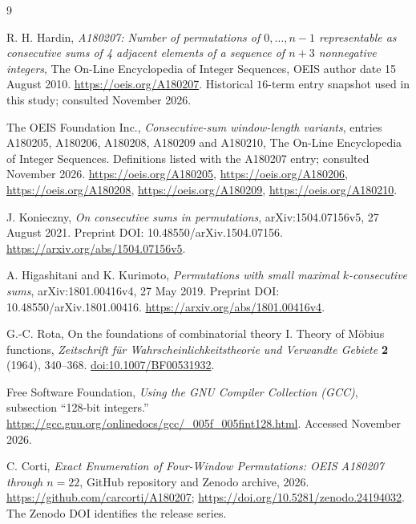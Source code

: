 \documentclass[11pt]{article}
\theoremstyle{definition}
\theoremstyle{remark}
\begin{document}
\clearpage
\begin{thebibliography}{9}
\raggedright

R. H. Hardin,
\emph{A180207: Number of permutations of $0,\ldots,n-1$ representable as
consecutive sums of 4 adjacent elements of a sequence of $n+3$ nonnegative
integers}, The On-Line Encyclopedia of Integer Sequences,
OEIS author date 15 August 2010.
\url{https://oeis.org/A180207}.
Historical $16$-term entry snapshot used in this study; consulted
November 2026.

The OEIS Foundation Inc.,
\emph{Consecutive-sum window-length variants}, entries
A180205, A180206, A180208, A180209 and A180210,
The On-Line Encyclopedia of Integer Sequences.
Definitions listed with the A180207 entry; consulted November 2026.
\url{https://oeis.org/A180205},
\url{https://oeis.org/A180206},
\url{https://oeis.org/A180208},
\url{https://oeis.org/A180209},
\url{https://oeis.org/A180210}.

J. Konieczny,
\emph{On consecutive sums in permutations},
arXiv:1504.07156v5, 27 August 2021.
Preprint DOI: 10.48550/arXiv.1504.07156.
\url{https://arxiv.org/abs/1504.07156v5}.

A. Higashitani and K. Kurimoto,
\emph{Permutations with small maximal $k$-consecutive sums},
arXiv:1801.00416v4, 27 May 2019.
Preprint DOI: 10.48550/arXiv.1801.00416.
\url{https://arxiv.org/abs/1801.00416v4}.

G.-C. Rota,
On the foundations of combinatorial theory I. Theory of M\"obius functions,
\emph{Zeitschrift f\"ur Wahrscheinlichkeitstheorie und Verwandte Gebiete}
\textbf{2} (1964), 340--368.
\href{https://link.springer.com/article/10.1007/BF00531932}{doi:10.1007/BF00531932}.

Free Software Foundation,
\emph{Using the GNU Compiler Collection (GCC)}, subsection ``128-bit integers.''
\url{https://gcc.gnu.org/onlinedocs/gcc/_005f_005fint128.html}.
Accessed November 2026.

C. Corti,
\emph{Exact Enumeration of Four-Window Permutations: OEIS A180207 through
$n=22$}, GitHub repository and Zenodo archive, 2026.
\url{https://github.com/carcorti/A180207};
\url{https://doi.org/10.5281/zenodo.24194032}.
The Zenodo DOI identifies the release series.

\end{thebibliography}
\end{document}

